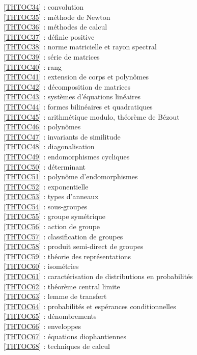\ref {THTOC34} : convolution\\
\ref {THTOC35} : méthode de Newton\\
\ref {THTOC36} : méthodes de calcul\\
\ref {THTOC37} : définie positive\\
\ref {THTOC38} : norme matricielle et rayon spectral\\
\ref {THTOC39} : série de matrices\\
\ref {THTOC40} : rang\\
\ref {THTOC41} : extension de corps et polynômes\\
\ref {THTOC42} : décomposition de matrices\\
\ref {THTOC43} : systèmes d'équations linéaires\\
\ref {THTOC44} : formes bilinéaires et quadratiques\\
\ref {THTOC45} : arithmétique modulo, théorème de Bézout\\
\ref {THTOC46} : polynômes\\
\ref {THTOC47} : invariants de similitude\\
\ref {THTOC48} : diagonalisation\\
\ref {THTOC49} : endomorphismes cycliques\\
\ref {THTOC50} : déterminant\\
\ref {THTOC51} : polynôme d'endomorphismes\\
\ref {THTOC52} : exponentielle\\
\ref {THTOC53} : types d'anneaux\\
\ref {THTOC54} : sous-groupes\\
\ref {THTOC55} : groupe symétrique\\
\ref {THTOC56} : action de groupe\\
\ref {THTOC57} : classification de groupes\\
\ref {THTOC58} : produit semi-direct de groupes\\
\ref {THTOC59} : théorie des représentations\\
\ref {THTOC60} : isométries\\
\ref {THTOC61} : caractérisation de distributions en probabilités\\
\ref {THTOC62} : théorème central limite\\
\ref {THTOC63} : lemme de transfert\\
\ref {THTOC64} : probabilités et espérances conditionnelles\\
\ref {THTOC65} : dénombrements\\
\ref {THTOC66} : enveloppes\\
\ref {THTOC67} : équations diophantiennes\\
\ref {THTOC68} : techniques de calcul\\
